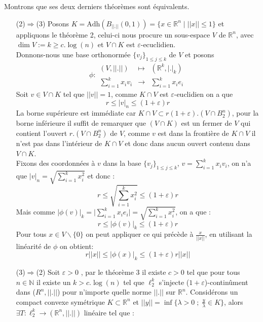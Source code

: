 \documentclass[12pt]{article}
\theoremstyle{definition}
\begin{document}
\noindent Montrons que ses deux derniers théorèmes sont équivalents.
\begin{enumerate}
	\item[(2)$\Rightarrow$(3)]
	Posons $K=\text{Adh}(B_{||.||}(0,1))=\{x\in\mathbb{R}^n \; | \; ||x||\leq 1 \}$ et appliquons le théorème 2, celui-ci nous procure un sous-espace $V$ de $\mathbb{R}^n$, avec $\dim V := k \geq c.\log(n)$ et $V\cap K$ est $\varepsilon\text{-ecuclidien}$.\\
	Donnons-nous une base orthonormée $\{v_j\}_{1\leq j \leq k}$ de $V$ et posons 
	\begin{equation*}
	\phi :\begin{array}{ccc}
	(V,||.||) & \mapsto &(\mathbb{R}^k,|.|_k) \\
	\sum_{i=1}^{k}x_i v_i & \to & \sum_{i=1}^{k}x_i e_i
	\end{array}
	\end{equation*}
	Soit $v\in V\cap K$ tel que $||v||=1$, comme $K\cap V$ est $\varepsilon$-euclidien on a que 
	\begin{equation*}
	r \leq |v|_n \leq (1+\varepsilon)r
	\end{equation*}
	La borne supérieure est immédiate car  $K\cap V \subset r(1+\varepsilon).(V\cap B^n_2)$, pour la borne inférieure il suffit de remarquer que $(V\cap K)$ est un fermer de $V$ qui contient l'ouvert $r.(V\cap B^n_2)$ de $V$, comme $v$ est dans la frontière de $K\cap V$ il n'est pas dans l'intérieur de $K\cap V$ et donc dans aucun ouvert contenu dans $V\cap K$.\\
	Fixons des coordonnées à $v$ dans la base $\{v_j\}_{1\leq j \leq k}$, $v = \sum_{i=1}^{k}x_iv_i$, on n'a que $|v|_n = \sqrt{\sum_{i=1}^{k}x_i^2}$ et donc :
	\begin{equation*}
	r \leq \sqrt{\sum_{i=1}^{k}x_i^2} \leq (1+\varepsilon)r
	\end{equation*}
	Mais comme $|\phi(v)|_k = \big|\sum_{i=1}^{k}x_i e_i \big| = \sqrt{\sum_{i=1}^{k}x_i^2}$, on a que :
	\begin{equation*}
	r \leq |\phi(v)|_k \leq (1+\varepsilon)r
	\end{equation*}
	Pour tous $x\in  V\backslash\{0\}$ on peut appliquer ce qui précède à $\frac{x}{||x||}$, en utilisant la linéarité de $\phi$ on obtient:
	\begin{equation*}
	r||x||\leq |\phi(x)|_k \leq (1+\varepsilon)r ||x||
	\end{equation*}
	\item[(3)$\Rightarrow$(2)]
	Soit $\varepsilon>0$ , par le théorème 3 il existe $c>0$ tel que pour tous $n\in\mathbb{N}$ il existe un $k>c.\log(n)$ tel que $\ell_2^k$ s'injecte ($1+\varepsilon$)-continûment dans ($R^n,||.||$) pour n’importe quelle norme $||.||$ sur $\mathbb{R}^n$. Considérons un compact convexe symétrique $K\subset \mathbb{R}^n$ et $||y||=\inf\Big\{\lambda>0\; ;\; \frac{y}{\lambda}\in K\Big\}$, alors $\exists T :\ell^{k}_2\to(\mathbb{R}^n,||.||)$ linéaire tel que :

\end{enumerate}
\end{document}
